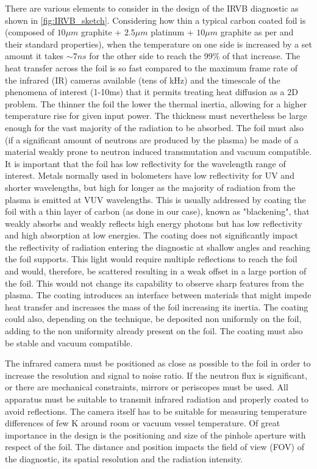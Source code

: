 There are various elements to consider in the design of the IRVB diagnostic as shown in \autoref{fig:IRVB_sketch}.
Considering how thin a typical carbon coated foil is (composed of $10\mu m$ graphite + $2.5\mu m$ platinum + $10\mu m$ graphite as per \cite{Pandya2014} and their standard properties), when the temperature on one side is increased by a set amount it takes $\sim7ns$ for the other side to reach the 99\% of that increase. The heat transfer across the foil is so fast compared to the maximum frame rate of the infrared (IR) cameras available (tens of kHz) and the timescale of the phenomena of interest (1-10ms) that it permits treating heat diffusion as a 2D problem. The thinner the foil the lower the thermal inertia, allowing for a higher temperature rise for given input power. The thickness must nevertheless be large enough for the vast majority of the radiation to be absorbed. The foil must also (if a significant amount of neutrons are produced by the plasma) be made of a material weakly prone to neutron induced transmutation and vacuum compatible.\cite{Mukai2021}
It is important that the foil has low reflectivity for the wavelength range of interest. Metals normally used in bolometers have low reflectivity for UV and shorter wavelengths, but high for longer as the majority of radiation from the plasma is emitted at VUV wavelengths. This is usually addressed by coating the foil with a thin layer of carbon (as done in our case), known as "blackening", that weakly absorbs and weakly reflects high energy photons but has low reflectivity and high absorption at low energies. The coating does not significantly impact the reflectivity of radiation entering the diagnostic at shallow angles and reaching the foil supports.\cite{Gullikson2022} This light would require multiple reflections to reach the foil and would, therefore, be scattered resulting in a weak offset in a large portion of the foil. This would not change its capability to observe sharp features from the plasma. The coating introduces an interface between materials that might impede heat transfer and increases the mass of the foil increasing its inertia. The coating could also, depending on the technique, be deposited non uniformly on the foil, adding to the non uniformity already present on the foil. The coating must also be stable and vacuum compatible.\cite{Mukai2016}

The infrared camera must be positioned as close as possible to the foil in order to increase the resolution and signal to noise ratio. If the neutron flux is significant, or there are mechanical constraints, mirrors or periscopes must be used. All apparatus must be suitable to transmit infrared radiation and properly coated to avoid reflections. The camera itself has to be suitable for measuring temperature differences of few K around room or vacuum vessel temperature.
Of great importance in the design is the positioning and size of the pinhole aperture with respect of the foil. The distance and position impacts the field of view (FOV) of the diagnostic, its spatial resolution and the radiation intensity.


